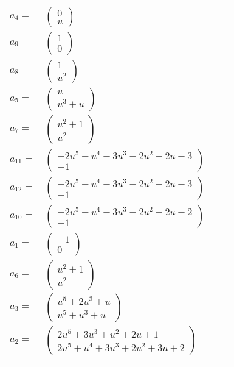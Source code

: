\documentclass[1p]{elsarticle_modified}
\theoremstyle{definition}
\begin{document}
\begin{tabular}{m{7pt} m{180pt} m{7pt} m{180pt} }
\flushright $a_{4}=$&$\begin{pmatrix}0\\u\end{pmatrix}$ \\
\flushright $a_{9}=$&$\begin{pmatrix}1\\0\end{pmatrix}$ \\
\flushright $a_{8}=$&$\begin{pmatrix}1\\u^2\end{pmatrix}$ \\
\flushright $a_{5}=$&$\begin{pmatrix}u\\u^3+u\end{pmatrix}$ \\
\flushright $a_{7}=$&$\begin{pmatrix}u^2+1\\u^2\end{pmatrix}$ \\
\flushright $a_{11}=$&$\begin{pmatrix}-2 u^5- u^4-3 u^3-2 u^2-2 u-3\\-1\end{pmatrix}$ \\
\flushright $a_{12}=$&$\begin{pmatrix}-2 u^5- u^4-3 u^3-2 u^2-2 u-3\\-1\end{pmatrix}$ \\
\flushright $a_{10}=$&$\begin{pmatrix}-2 u^5- u^4-3 u^3-2 u^2-2 u-2\\-1\end{pmatrix}$ \\
\flushright $a_{1}=$&$\begin{pmatrix}-1\\0\end{pmatrix}$ \\
\flushright $a_{6}=$&$\begin{pmatrix}u^2+1\\u^2\end{pmatrix}$ \\
\flushright $a_{3}=$&$\begin{pmatrix}u^5+2 u^3+u\\u^5+u^3+u\end{pmatrix}$ \\
\flushright $a_{2}=$&$\begin{pmatrix}2 u^5+3 u^3+u^2+2 u+1\\2 u^5+u^4+3 u^3+2 u^2+3 u+2\end{pmatrix}$\\&\end{tabular}
\end{document}
